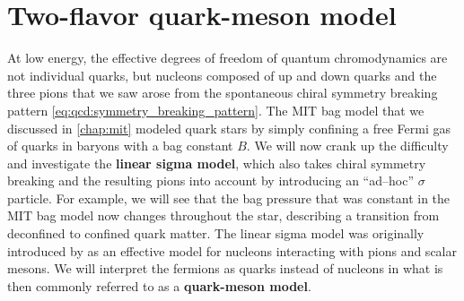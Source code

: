 \chapter{Two-flavor quark-meson model}
\label{chap:lsm2f}






At low energy, the effective degrees of freedom of quantum chromodynamics are not individual quarks,
but nucleons composed of up and down quarks and the three pions that we saw arose from the spontaneous chiral symmetry breaking pattern \eqref{eq:qcd:symmetry_breaking_pattern}.
The MIT bag model that we discussed in \cref{chap:mit} modeled quark stars by simply confining a free Fermi gas of quarks in baryons with a bag constant $B$.
We will now crank up the difficulty and investigate the \textbf{linear sigma model}, which also takes chiral symmetry breaking and the resulting pions into account by introducing an ``ad--hoc'' $\sigma$ particle.
For example, we will see that the bag pressure that was constant in the MIT bag model now changes throughout the star, describing a transition from deconfined to confined quark matter.
The linear sigma model was originally introduced by \cite{ref:lsm_original} as an effective model for nucleons interacting with pions and scalar mesons.
We will interpret the fermions as quarks instead of nucleons in what is then commonly referred to as a \textbf{quark-meson model}.

